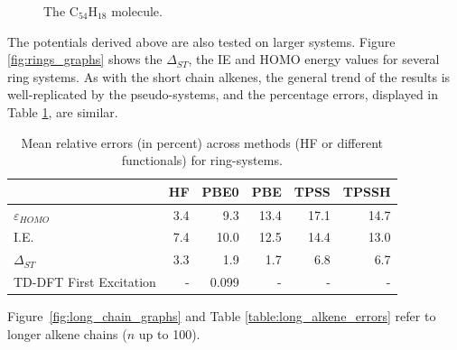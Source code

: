 \documentclass[aip]{revtex4-1}
\begin{document}
\begin{figure}
\begin{center}
\end{center}
\caption{\label{fig:c54h18}The C\(_{54}\)H\(_{18}\) molecule.}
\end{figure}

The potentials derived above are also tested on larger systems.
Figure \ref{fig:rings_graphs} shows the $\Delta_{ST}$, the IE and
HOMO energy values for several ring systems.
As with the short chain alkenes, the general trend of the results is well-replicated
by the pseudo-systems, and the percentage errors, displayed in Table
\ref{table:ring_system_errors}, are similar.

\begin{table}[ht]
\begin{tabular}{l r r r r r }
\hline\hline
                        & HF & PBE0 & PBE & TPSS & TPSSH \\
\hline
$\varepsilon_{HOMO}$    & 3.4 &  9.3  & 13.4 & 17.1 & 14.7 \\
I.E.                    & 7.4 & 10.0  & 12.5 & 14.4 & 13.0 \\
$\Delta_{ST}$           & 3.3 &  1.9  &  1.7 &  6.8 &  6.7 \\
TD-DFT First Excitation &   - & 0.099 &    - &    - &    - \\ 
\hline\hline
\end{tabular}
\caption{Mean relative errors (in percent) across methods (HF or different functionals)
for ring-systems.}
\label{table:ring_system_errors}
\end{table}

Figure~\ref{fig:long_chain_graphs} and Table \ref{table:long_alkene_errors} refer to longer 
alkene chains (\(n\) up to 100).
\end{document}

